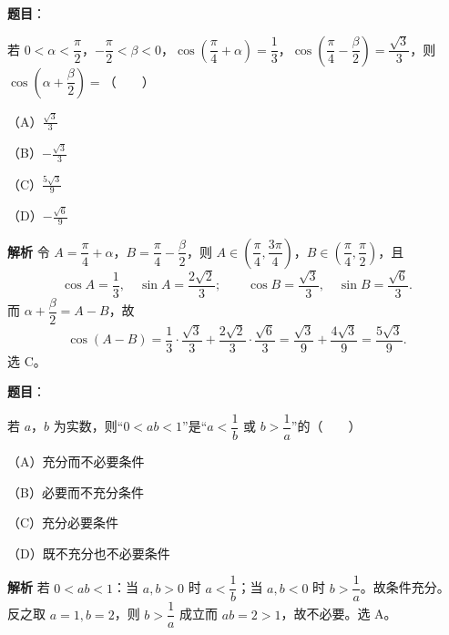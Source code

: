 \begin{answer}

\textbf{题目}：

若 $0<\alpha<\dfrac\pi2$，$-\dfrac\pi2<\beta<0$，$\cos\left(\dfrac\pi4+\alpha\right)=\dfrac13$，$\cos\left(\dfrac\pi4-\dfrac\beta2\right)=\dfrac{\sqrt3}3$，则 $\cos\left(\alpha+\dfrac\beta2\right)=$\mbox{（　　）}

（A）$\frac{\sqrt3}3$

（B）$-\frac{\sqrt3}3$

（C）$\frac{5\sqrt3}9$

（D）$-\frac{\sqrt6}9$

\textbf{解析}
令 $A=\dfrac\pi4+\alpha$，$B=\dfrac\pi4-\dfrac\beta2$，则 $A\in\left(\dfrac\pi4,\dfrac{3\pi}4\right)$，$B\in\left(\dfrac\pi4,\dfrac\pi2\right)$，且
\nopagebreak[4]
\[\cos A=\frac13,\quad \sin A=\frac{2\sqrt2}3;\qquad \cos B=\frac{\sqrt3}3,\quad \sin B=\frac{\sqrt6}3.\]
而 $\alpha+\dfrac\beta2=A-B$，故
\nopagebreak[4]
\[\cos(A-B)=\frac13\cdot\frac{\sqrt3}3+\frac{2\sqrt2}3\cdot\frac{\sqrt6}3=\frac{\sqrt3}9+\frac{4\sqrt3}9=\frac{5\sqrt3}9.\]
选 C。


\end{answer}
\begin{answer}

\textbf{题目}：

若 $a$，$b$ 为实数，则“$0<ab<1$”是“$a<\dfrac1b$ 或 $b>\dfrac1a$”的\mbox{（　　）}

（A）充分而不必要条件

（B）必要而不充分条件

（C）充分必要条件

（D）既不充分也不必要条件

\textbf{解析}
若 $0<ab<1$：当 $a,b>0$ 时 $a<\dfrac1b$；当 $a,b<0$ 时 $b>\dfrac1a$。故条件充分。
反之取 $a=1,b=2$，则 $b>\dfrac1a$ 成立而 $ab=2>1$，故不必要。选 A。


\end{answer}

